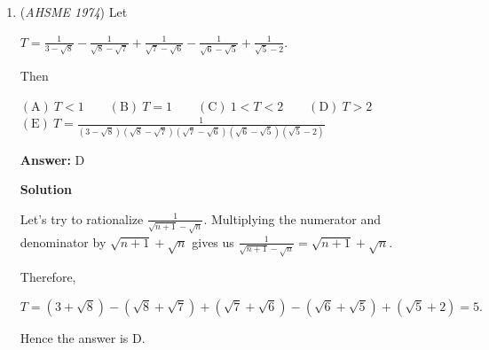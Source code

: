 \begin{enumerate}
 Therefore, $CN^2=x^2+1=(2-\sqrt{3})^2+1=8-4\sqrt{3}$. The area of an equilateral triangle with side length $x$ is equal to $\frac{x^2\sqrt{3}}{4}$, so the area of $\triangle CMN$ is $\frac{(8-4\sqrt{3})(\sqrt{3})}{4}=2\sqrt{3}-3, \boxed{\text{A}}$.

 



\textbf{Solution 2 (Visualization + Using Ratios)}

We know there is only one way to fit an equilateral triangle into a square: one of its vertices is a corner of the square and the other two vertices fall on opposite sides (try to imagine it in your head). It must be symmetrical along a diagonal of the square.

 Thus $\triangle CNB \sim\triangle CDM$ where both are $15^{\circ}-75^{\circ}-90^{\circ}$ triangles since $\angle MCN=60^{\circ}$

 Using the $15^{\circ}-75^{\circ}-90^{\circ}$ ratios ($2-\sqrt3:1:\sqrt6-\sqrt2$), we have $CN = \sqrt6 - \sqrt2$.

 Thus $[\triangle CMN] = \frac{\sqrt3}{4}(\sqrt6 - \sqrt2)^2 = \frac{\sqrt3}{4}(8-4\sqrt3) = 2\sqrt3-3 \Rightarrow \fbox{A}$.

 $\sim$ Jonysun

 


	\item (\textit{AHSME 1974}) Let


 $T=\frac{1}{3-\sqrt{8}}-\frac{1}{\sqrt{8}-\sqrt{7}}+\frac{1}{\sqrt{7}-\sqrt{6}}-\frac{1}{\sqrt{6}-\sqrt{5}}+\frac{1}{\sqrt{5}-2}.$


 Then


 $\mathrm{(A)\ } T<1 \qquad \mathrm{(B) \ }T=1 \qquad \mathrm{(C) \  } 1<T<2 \qquad \mathrm{(D) \  } T>2 \qquad$
$\mathrm{(E) \  }T=\frac{1}{(3-\sqrt{8})(\sqrt{8}-\sqrt{7})(\sqrt{7}-\sqrt{6})(\sqrt{6}-\sqrt{5})(\sqrt{5}-2)}$

 \textbf{Answer: }D



\textbf{Solution}

Let's try to rationalize $\frac{1}{\sqrt{n+1}-\sqrt{n}}$. Multiplying the numerator and denominator by $\sqrt{n+1}+\sqrt{n}$ gives us $\frac{1}{\sqrt{n+1}-\sqrt{n}}=\sqrt{n+1}+\sqrt{n}$.

 Therefore,

 
 \[T=(3+\sqrt{8})-(\sqrt{8}+\sqrt{7})+(\sqrt{7}+\sqrt{6})-(\sqrt{6}+\sqrt{5})+(\sqrt{5}+2)=5.\]

 Hence the answer is $\boxed{\text{D}}$.


\end{enumerate}
